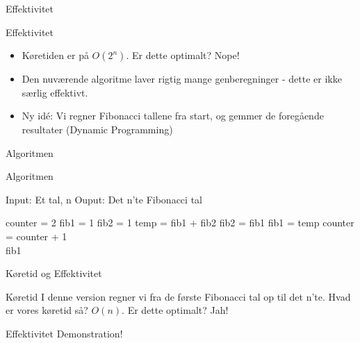 \documentclass[12pt,t]{beamer}
\begin{document}
    \begin{frame}{Effektivitet}
        \begin{block}{Effektivitet}
            \begin{itemize}
            \item Køretiden er på $O(2^n)$. Er dette optimalt? \pause \alert{Nope!} \pause
            \item Den nuværende algoritme laver rigtig mange genberegninger - dette er 
            ikke særlig effektivt. \pause
            \item Ny idé: Vi regner Fibonacci tallene fra start, og gemmer de foregående 
            resultater (Dynamic Programming)
            \end{itemize}
        \end{block}
    \end{frame}

    \begin{frame}{Algoritmen}
        \vspace{-1em}
        \begin{exampleblock}{Algoritmen}
        \vspace{-1.5em}
        \begin{algorithm}[H]
            \caption{\newline Input: Et tal, n
                     \newline Ouput: Det n'te Fibonacci tal
            }
            \begin{algorithmic}
                    \State counter     = 2
                    \State fib1        = 1
                    \State fib2        = 1
                        \State temp = fib1 + fib2
                        \State fib2 = fib1
                        \State fib1 = temp
                        \State counter = counter + 1
                    \EndWhile\\
                    \Return fib1
                \EndFunction
            \end{algorithmic}
        \end{algorithm}
        \end{exampleblock}
    \end{frame}

    \begin{frame}{Køretid og Effektivitet}
        \begin{block}{Køretid}
            I denne version regner vi fra de første Fibonacci tal op til det 
            n'te. Hvad er vores køretid så? \pause $O(n)$. Er dette optimalt? 
            \pause \alert{Jah!} 
        \end{block}
        \pause
        \begin{block}{Effektivitet}
            Demonstration!
        \end{block}
    \end{frame}
\end{document}
